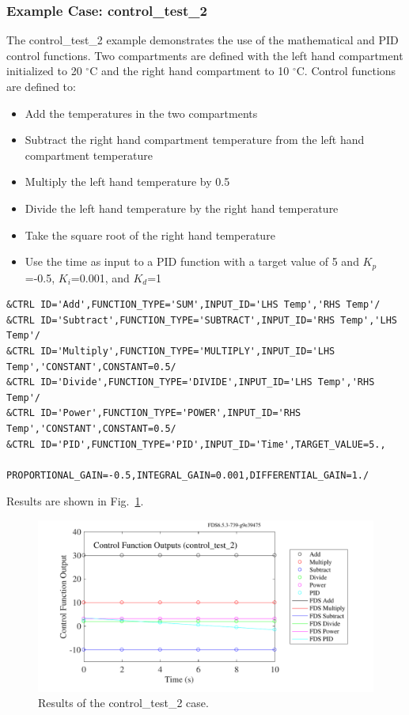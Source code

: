\documentclass[11pt]{book}
\begin{document}
\subsubsection{Example Case: control\_test\_2 }

The {\ct control\_test\_2} example demonstrates the use of the mathematical and PID control functions.  Two compartments are defined with the left hand compartment initialized to 20 $^\circ$C and the right hand compartment to 10 $^\circ$C.    Control functions are defined to:

\begin{itemize}
\item Add the temperatures in the two compartments
\item Subtract the right hand compartment temperature from the left hand compartment temperature
\item Multiply the left hand temperature by 0.5
\item Divide the left hand temperature by the right hand temperature
\item Take the square root of the right hand temperature
\item Use the time as input to a PID function with a target value of 5 and $K_p$=-0.5, $K_i$=0.001, and $K_d$=1
\end{itemize}

\begin{lstlisting}
&CTRL ID='Add',FUNCTION_TYPE='SUM',INPUT_ID='LHS Temp','RHS Temp'/
&CTRL ID='Subtract',FUNCTION_TYPE='SUBTRACT',INPUT_ID='RHS Temp','LHS Temp'/
&CTRL ID='Multiply',FUNCTION_TYPE='MULTIPLY',INPUT_ID='LHS Temp','CONSTANT',CONSTANT=0.5/
&CTRL ID='Divide',FUNCTION_TYPE='DIVIDE',INPUT_ID='LHS Temp','RHS Temp'/
&CTRL ID='Power',FUNCTION_TYPE='POWER',INPUT_ID='RHS Temp','CONSTANT',CONSTANT=0.5/
&CTRL ID='PID',FUNCTION_TYPE='PID',INPUT_ID='Time',TARGET_VALUE=5.,
          PROPORTIONAL_GAIN=-0.5,INTEGRAL_GAIN=0.001,DIFFERENTIAL_GAIN=1./
\end{lstlisting}

\noindent Results are shown in Fig.~\ref{control_test_2_fig}.
\begin{figure}[ht]
\centering
\includegraphics[scale=0.55]{SCRIPT_FIGURES/control_test_2}
\caption[Results of the {\ct control\_test\_2} case]{Results of the {\ct control\_test\_2} case.}
\label{control_test_2_fig}
\end{figure}
\end{document}
